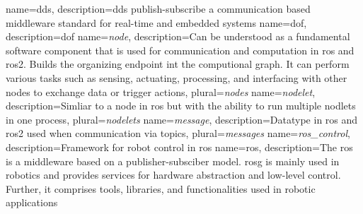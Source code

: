 \hyphenation{
}

\newcommand{\mybibliographyfiles}{Bibliography/ipr_articles,Bibliography/kit_template_example_bibliography,Bibliography/masterthesis}


{
    name={\gls{dds}},
    description={\acrlong{dds} publish-subscribe a communication based middleware standard for real-time and embedded systems \cite{noauthor_data_nodate}}
}
{
    name={\gls{dof}},
    description={\acrlong{dof}}
}
{
    name={\textit{node}},
    description={Can be understood as a fundamental software component that is used for communication and computation in \gls{ros} and \gls{ros2}. Builds the organizing endpoint int the computional graph. It can perform various tasks such as sensing, actuating, processing, and interfacing with other nodes to exchange data or trigger actions},
    plural={\textit{nodes}}
}
{
    name={\textit{nodelet}},
    description={Simliar to a \gls{node} in \gls{ros} but with the ability to run multiple nodlets in one process},
    plural={\textit{nodelets}}
}
{
    name={\textit{message}},
    description={Datatype in \gls{ros} and \gls{ros2} used when communication via \glspl{topic}},
    plural={\textit{messages}}
}
{
    name={\textit{ros\_control}},
    description={Framework for robot control in \gls{ros}}
}
{
    name={\gls{ros}},
    description={The \acrlong{ros} is a middleware based on a publisher-subsciber model. \gls{rosg} is mainly used in robotics and provides services for hardware abstraction and low-level control. Further, it comprises tools, libraries, and functionalities used in robotic applications}
}
